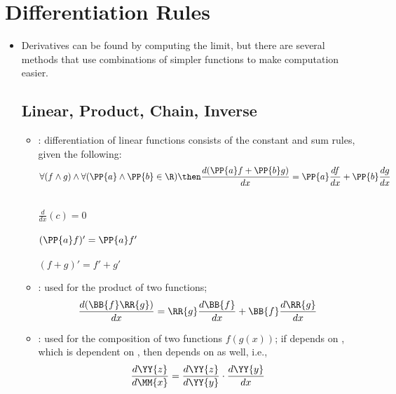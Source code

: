 \section{Differentiation Rules}
\begin{itemize}
   \item Derivatives can be found by computing the limit, but there are several
     methods that use combinations of simpler functions to make computation
     easier.

  \subsection{Linear, Product, Chain, Inverse}
  \begin{itemize}
    \item {}: differentiation of linear functions consists of the
      constant and sum rules, given the following:
    \[
      \forall(f \land g) \land \forall(\PP{a} \land \PP{b} \in \R) \then
      \frac{d(\PP{a}f + \PP{b}g)}{dx} = \PP{a}\frac{df}{dx} +
      \PP{b}\frac{dg}{dx}
    \]
    \vspace{-18pt}
    \begin{multicols}{3}
       \\ \( \frac{d}{dx} (c) = 0\) \\
       \\ \( (\PP{a}f)' = \PP{a}f' \) \\
       \\ \( (f + g)' = f' + g' \) \\
    \end{multicols}

    \item {}: used for the product of two functions; 
      \[
        \frac{d(\BB{f}\RR{g})}{dx} = \RR{g} \frac{d\BB{f}}{dx} +
        \BB{f}\frac{d\RR{g}}{dx}
      \]
    \item {}: used for the composition of two functions \( f(g(x))
      \); if  depends on , which is dependent on
      , then  depends on  as well, i.e.,
      \[
        \frac{d \YY{z}}{d \MM{x}} = \frac{d \YY{z}}{d \YY{y}} \cdot \frac{d
        \YY{y}}{dx}
      \]
      \begin{itemize}


\end{itemize}
\end{itemize}
\end{itemize}
